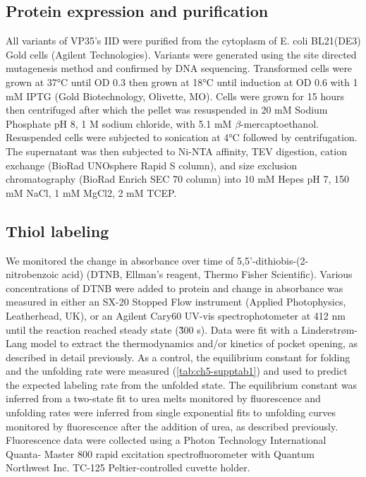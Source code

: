 \documentclass[../main.tex]{subfiles}
\begin{document}
    \subsection{Protein expression and purification}
        All variants of VP35’s IID were purified from the cytoplasm of E. coli BL21(DE3) Gold cells (Agilent Technologies). Variants were generated using the site directed mutagenesis method and confirmed by DNA sequencing. Transformed cells were grown at 37°C until OD 0.3 then grown at 18°C until induction at OD 0.6 with 1 mM IPTG (Gold Biotechnology, Olivette, MO). Cells were grown for 15 hours then centrifuged after which the pellet was resuspended in 20 mM Sodium Phosphate pH 8, 1 M sodium chloride, with 5.1 mM $\beta$-mercaptoethanol. Resuspended cells were subjected to sonication at 4°C followed by centrifugation. The supernatant was then subjected to Ni-NTA affinity, TEV digestion, cation exchange (BioRad UNOsphere Rapid S column), and size exclusion chromatography (BioRad Enrich SEC 70 column) into 10 mM Hepes pH 7, 150 mM NaCl, 1 mM MgCl2, 2 mM TCEP. 

    \subsection{Thiol labeling}
        We monitored the change in absorbance over time of 5,5’-dithiobis-(2-nitrobenzoic acid) (DTNB, Ellman’s reagent, Thermo Fisher Scientific). Various concentrations of DTNB were added to protein and change in absorbance was measured in either an SX-20 Stopped Flow instrument (Applied Photophysics, Leatherhead, UK), or an Agilent Cary60 UV-vis spectrophotometer at 412 nm until the reaction reached steady state (\~300 s). Data were fit with a Linderstrøm-Lang model to extract the thermodynamics and/or kinetics of pocket opening, as described in detail previously\cite{Porter:2019hv}. As a control, the equilibrium constant for folding and the unfolding rate were measured (\ref{tab:ch5-supptab1}) and used to predict the expected labeling rate from the unfolded state. The equilibrium constant was inferred from a two-state fit to urea melts monitored by fluorescence and unfolding rates were inferred from single exponential fits to unfolding curves monitored by fluorescence after the addition of urea, as described previously\cite{Porter:2019hv,Bowman:2015dh,zimmerman_prediction_2017}. Fluorescence data were collected using a Photon Technology International Quanta- Master 800 rapid excitation spectrofluorometer with Quantum Northwest Inc. TC-125 Peltier-controlled cuvette holder. 
\end{document}
